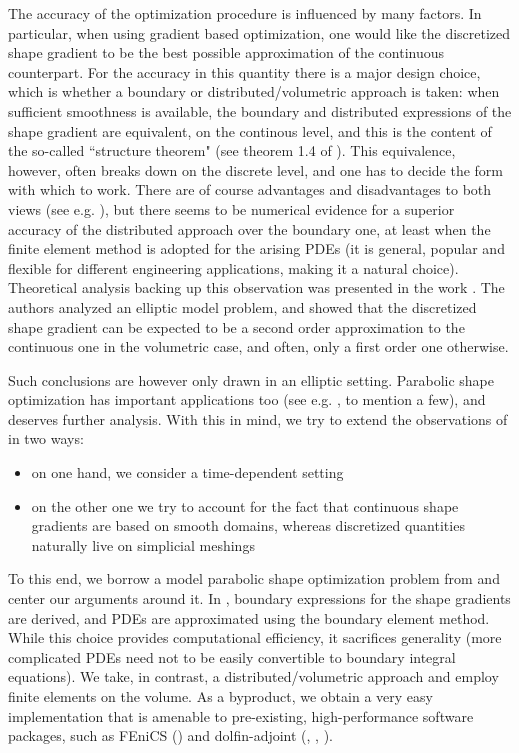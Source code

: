 \documentclass[english,a4paper,9pt,oneside]{scrbook}	%
\theoremstyle{break}
\theoremstyle{remark}
\begin{document}
The accuracy of the optimization procedure is influenced by many factors. In particular, when using gradient based optimization, one would like the discretized shape gradient to be the best possible approximation of the continuous counterpart. For the accuracy in this quantity there is a major design choice, which is whether a boundary or distributed/volumetric approach is taken: when sufficient smoothness is available, the boundary and distributed expressions of the shape gradient are equivalent, on the continous level, and this is the content of the so-called ``structure theorem" (see theorem 1.4 of \cite{avg_adj}). This equivalence, however, often breaks down on the discrete level, and one has to decide the form with which to work. There are of course advantages and disadvantages to both views (see e.g. \cite{avg_adj}), but there seems to be numerical evidence for a superior accuracy of the distributed approach over the boundary one, at least when the finite element method is adopted for the arising PDEs (it is general, popular and flexible for different engineering applications, making it a natural choice). Theoretical analysis backing up this observation was presented in the work \cite{paganini}. The authors analyzed an elliptic model problem, and showed that the discretized shape gradient can be expected to be a second order approximation to the continuous one in the volumetric case, and often, only a first order one otherwise. 

Such conclusions are however only drawn in an elliptic setting. Parabolic shape optimization has important applications too (see e.g. \cite{lindemann2}, \cite{harbrecht} to mention a few), and deserves further analysis. With this in mind, we try to extend the observations of \cite{paganini} in two ways: 

\begin{itemize}
\item on one hand, we consider a time-dependent setting
\item on the other one we try to account for the fact that continuous shape gradients are based on smooth domains, whereas discretized quantities naturally live on simplicial meshings
\end{itemize}

To this end, we borrow a model parabolic shape optimization problem from \cite{harbrecht} and center our arguments around it. In \cite{harbrecht}, boundary expressions for the shape gradients are derived, and PDEs are approximated using the boundary element method. While this choice provides computational efficiency, it sacrifices generality (more complicated PDEs need not to be easily convertible to boundary integral equations). We take, in contrast, a distributed/volumetric approach and employ finite elements on the volume. As a byproduct, we obtain a very easy implementation that is amenable to pre-existing, high-performance software packages, such as FEniCS (\cite{fenics}) and dolfin-adjoint (\cite{dolfin-adjoint_1}, \cite{dolfin-adjoint_2}, \cite{dolfin-adjoint_3}). 
\end{document}
